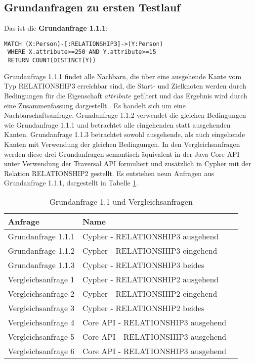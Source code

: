 \subsection{Grundanfragen zu ersten Testlauf}
Das ist die \textbf{Grundanfrage 1.1.1}: 
\begin{Verbatim}[frame=single]
 MATCH (X:Person)-[:RELATIONSHIP3]->(Y:Person) 
 WHERE X.attribute>=250 AND Y.attribute>=15  
 RETURN COUNT(DISTINCT(Y))
\end{Verbatim} 
Grundanfrage 1.1.1 findet alle Nachbarn, die über eine ausgehende Kante vom Typ RELATIONSHIP3 erreichbar sind, die Start- und Zielknoten werden durch Bedingungen für die Eigenschaft $attribute$  gefiltert und das Ergebnis wird durch eine Zusammenfassung dargestellt . Es handelt sich um eine Nachbarschaftsanfrage.
 Grundanfrage 1.1.2 verwendet die gleichen Bedingungen wie Grundanfrage 1.1.1 und betrachtet alle eingehenden statt ausgehenden Kanten. Grundanfrage 1.1.3 betrachtet sowohl ausgehende, als auch eingehende Kanten mit Verwendung der gleichen Bedingungen. In den Vergleichsanfragen werden diese drei Grundanfragen semantisch äquivalent in der Java Core API unter Verwendung der Traversal API formuliert und zusätzlich in Cypher mit der Relation RELATIONSHIP2 gestellt. Es entstehen neun Anfragen aus Grundanfrage 1.1.1, dargestellt in Tabelle \ref{tab:Intro_Query2_1}.
\FloatBarrier
\begin{table}[h]
	\centering
	\begin{tabular}{ |p{5cm}||p{7cm}|p{3cm}  }
		\hline
		Anfrage& Name\\
		\hline
		Grundanfrage 1.1.1 &  Cypher - RELATIONSHIP3 ausgehend\\
		Grundanfrage 1.1.2 &  Cypher - RELATIONSHIP3 eingehend\\
		Grundanfrage 1.1.3 &  Cypher - RELATIONSHIP3 beides\\
		Vergleichsanfrage 1 &  Cypher - RELATIONSHIP2 ausgehend\\
		Vergleichsanfrage 2 &  Cypher - RELATIONSHIP2 eingehend\\
		Vergleichsanfrage 3 &  Cypher - RELATIONSHIP2 beides\\
		Vergleichsanfrage 4 &  Core API - RELATIONSHIP3 ausgehend\\
		Vergleichsanfrage 5 &  Core API - RELATIONSHIP3 ausgehend\\
		Vergleichsanfrage 6 &  Core API - RELATIONSHIP3 ausgehend\\
		\hline
	\end{tabular}
	\caption{Grundanfrage 1.1 und Vergleichsanfragen}
	\label{tab:Intro_Query2_1}
\end{table}
\FloatBarrier


